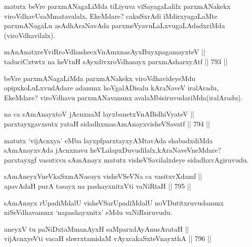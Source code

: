 \begin{artha}
matutx beVre parxmANagaLiMda tiLiyuva viSayagaLalilx parxmANakekx viroVdhavUsaMmatavalalx, EkeMdare? cakuSxrAdi iMdirxyagaLaMte parxmANagaLu asAdhAraNavAda parxmeVyavuLaLxvugaLAdadxriMda (viroVdhavilalx).
\end{artha}

\begin{shl}
mAnAnatxreYviRroVdhashecxVnAmxnasAyxBuyxpagamayxteV || \\
taduciCxtwtx na heVtuH sAyxdivxroVdhasayx parxmAsharxyAtf \hfill || 793 ||  
\end{shl}

\begin{artha}
beVre parxmANagaLiMda parxmANakekx viroVdhavideyeMdu opipxkoLuLxvudAdare adanunx hoVgalADisalu kAraNaveV iralAradu, EkeMdare? viroVdhavu parxmANavanunx avalaMbisiruvudariMda(iralAradu).
\end{artha}


\begin{shl}
na ca sAmAnayxtoV jAcnxnaM layxbanetxVnABidhiVyateV || \\
parxtayxgavxsutx yataH sidadhxmasAmAnayxvisheVSavatf \hfill || 794 ||  
\end{shl}

\begin{artha}
matutx `vijAcnxya' eMba layxpfparxtayxyAMtavAda shabadxdiMda sAmAnayxvAda jAcnxnavu heVLalapxDuvudilalx,kAraNaveVneMdare? parxtayxgf vasutxvu sAmAnayx matutx visheVSavilalxdeye sidadhxvAgiruvudu.
\end{artha}


\begin{shl}
sAmAneyxVneVkaSxmANasayx visheVSeVNa ca vasitxvXdamf || \\
apavAdaH purA tasayx na pashayxnitxVti vaNiRtaH \hfill || 795 ||  
\end{shl}

\begin{artha}
sAmAnayx rUpadiMdalU visheVSarUpadiMdalU noVDutitxruvudanunx niSeVdhavanunx `napashayxnitx' eMdu vaNiRsiruvudu.
\end{artha}


\begin{shl}
aneyxV tu paNiDxtaMmanAyxH saMparxdAyAnusArataH || \\
vijAcnxyeVti vacaH shwrxtamidaM vAyxcakaSxteV\s nayxthA \hfill || 796 ||  
\end{shl}

